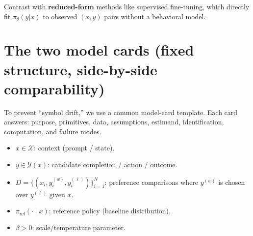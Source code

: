 \documentclass[11pt]{article}
\newcommand{\1}{\mathbf{1}}
\theoremstyle{plain}
\theoremstyle{definition}
\theoremstyle{remark}
\begin{document}
Contrast with \textbf{reduced-form} methods like supervised fine-tuning, which directly fit $\pi_\theta(y|x)$ to observed $(x,y)$ pairs without a behavioral model.

\newpage
\section{The two model cards (fixed structure, side-by-side comparability)}
To prevent ``symbol drift,'' we use a common model-card template. Each card answers: purpose, primitives,
data, assumptions, estimand, identification, computation, and failure modes.

\vspace{0.5em}
\begin{tcolorbox}[colback=light, colframe=accent, title=Common notation]
\begin{itemize}
\item $x\in\mathcal{X}$: context (prompt / state).
\item $y\in\mathcal{Y}(x)$: candidate completion / action / outcome.
\item $D=\{(x_i, y_i^{(w)}, y_i^{(\ell)})\}_{i=1}^N$: preference comparisons where $y^{(w)}$ is chosen over $y^{(\ell)}$ given $x$.
\item $\pi_{\mathrm{ref}}(\cdot\mid x)$: reference policy (baseline distribution).
\item $\beta>0$: scale/temperature parameter.
\end{itemize}
\end{tcolorbox}
\end{document}
